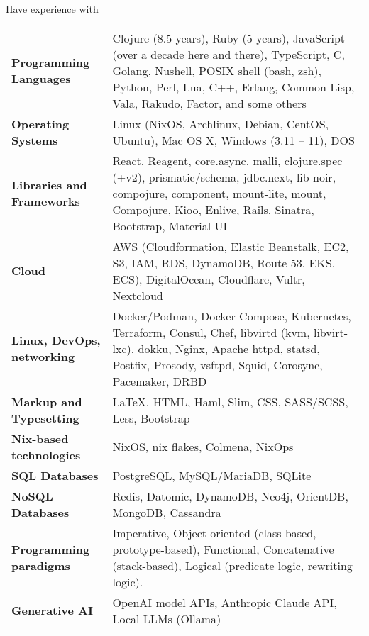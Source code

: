 \documentclass{resume} %
\begin{document}
\begin{rSection}{Have experience with}

\begin{tabular}{ @{} >{\bfseries}l @{\hspace{6ex}} p{11cm} }
Programming Languages & Clojure (8.5 years), Ruby (5 years),
                        JavaScript (over a decade here and there), TypeScript, C, Golang, Nushell, POSIX shell (bash, zsh), Python, Perl, Lua, C++, Erlang, Common Lisp, Vala, Rakudo, Factor, and some others
                        \smallskip \\
Operating Systems     & Linux (NixOS, Archlinux, Debian, CentOS,                                Ubuntu), Mac OS X, Windows (3.11 -- 11), DOS                            \smallskip \\
Libraries and Frameworks & React, Reagent, core.async, malli,
                           clojure.spec (+v2), prismatic/schema, jdbc.next, lib-noir, compojure, component, mount-lite, mount, Compojure, Kioo, Enlive, Rails, Sinatra, Bootstrap, Material UI
                           \smallskip \\
Cloud   & AWS (Cloudformation, Elastic Beanstalk, EC2,
          S3, IAM, RDS, DynamoDB, Route 53, EKS, ECS), DigitalOcean, 
          Cloudflare, Vultr, Nextcloud
          \smallskip \\
Linux, DevOps, networking &
     Docker/Podman, Docker Compose, Kubernetes, Terraform, Consul, Chef, libvirtd (kvm, libvirt-lxc), dokku, Nginx, Apache httpd, statsd, Postfix, Prosody, vsftpd, Squid, Corosync, Pacemaker, DRBD \smallskip \\
Markup and Typesetting & \LaTeX, HTML, Haml, Slim, CSS, SASS/SCSS,
                         Less, Bootstrap
                         \smallskip \\
Nix-based technologies & NixOS, nix flakes, Colmena, NixOps
                         \smallskip \\
SQL Databases & PostgreSQL, MySQL/MariaDB, SQLite
                \smallskip \\
NoSQL Databases & Redis, Datomic, DynamoDB, Neo4j,
                  OrientDB, MongoDB, Cassandra \smallskip \\
Programming paradigms & Imperative, Object-oriented (class-based,
                        prototype-based), Functional, Concatenative (stack-based), Logical (predicate logic, rewriting logic). \smallskip \\
Generative AI   & OpenAI model APIs, Anthropic Claude API,
                  Local LLMs (Ollama)
                  \smallskip \\
\end{tabular}

\end{rSection}
\end{document}
